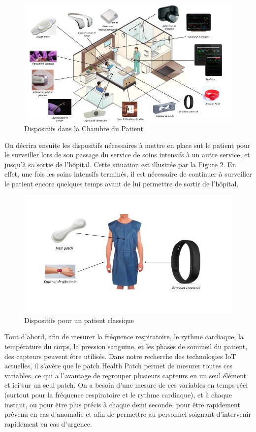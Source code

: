 \documentclass{article}
\begin{document}
\begin{figure}[h!]
	\hspace*{-3cm}
	\centering
	\includegraphics[width=1.5\textwidth]{Figure1.jpg}
	\caption{Dispositifs dans la Chambre du Patient}
	\label{fig:balance}
\end{figure}

On décrira ensuite les dispositifs nécessaires à mettre en place sut le patient pour le surveiller lors de son passage du service de soins intensifs à un autre service, et jusqu’à sa sortie de l’hôpital. Cette situation est illustrée par la Figure 2. En effet, une fois les soins intensifs terminés, il est nécessaire de continuer à surveiller le patient encore quelques temps avant de lui permettre de sortir de l’hôpital.
\\
\begin{figure}[h!]
	\hspace*{-1cm}
	\centering
	\includegraphics[width=1.2\textwidth]{Figure2.jpg}
	\caption{Dispositifs pour un patient classique}
	\label{fig:balance}
\end{figure}

Tout d’abord, afin de mesurer la fréquence respiratoire, le rythme cardiaque, la température du corps, la pression sanguine, et les phases de sommeil du patient, des capteurs peuvent être utilisés. Dans notre recherche des technologies IoT actuelles, il s’avère que le patch Health Patch \cite{HealthPatch} permet de mesurer toutes ces variables, ce qui a l’avantage de regrouper plusieurs capteurs en un seul élément  et ici sur un seul patch. On a besoin d’une mesure de ces variables en temps réel (surtout pour la fréquence respiratoire et le rythme cardiaque), et à chaque instant, ou pour être plus précis à chaque demi seconde, pour être rapidement prévenu en cas d’anomalie et afin de permettre au personnel soignant d’intervenir rapidement en cas d’urgence.
\end{document}

